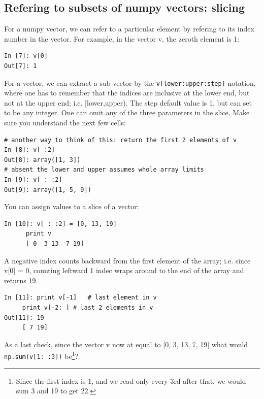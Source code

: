 \subsection{Refering to subsets of numpy vectors: slicing}\label{subsec:slicing}
For a numpy vector, we can refer to a particular element by refering to its 
index number in the vector. For example, in the vector v, the zeroth element 
is 1:
\begin{lstlisting}
In [7]: v[0]
Out[7]: 1	
\end{lstlisting}
For a vector, we can extract a sub-vector by the \lstinline{v[lower:upper:step]} notation, where 
one has to remember that the indices are inclusive at the lower end, but not at the upper end; 
i.e. [lower,upper). The step default value is 1, but can set to be any integer. 
One can omit any of the three parameters in the slice. Make sure you understand the next few cells:
\begin{lstlisting}
# another way to think of this: return the first 2 elements of v
In [8]: v[ :2] 
Out[8]: array([1, 3])
# absent the lower and upper assumes whole array limits
In [9]: v[ : :2] 
Out[9]: array([1, 5, 9])	
\end{lstlisting}
You can assign values to a slice of a vector:
\begin{lstlisting}
In [10]: v[ : :2] = [0, 13, 19]
	  print v
	  [ 0  3 13  7 19]	
\end{lstlisting}
A negative index counts backward from the first element of the array; i.e. since v[0] = 0, 
counting leftward 1 indec wraps around to the end of the array and returns 19.
\begin{lstlisting}
In [11]: print v[-1]   # last element in v
	 print v[-2: ] # last 2 elements in v
Out[11]: 19
	 [ 7 19]	
\end{lstlisting}
As a last check, since the vector v now at equal to [0, 3, 13, 7, 19] what would \lstinline{np.sum(v[1: :3])} be\footnote{Since the first index is 1, and we read only every 3rd after that, we would sum 3 and 19 to get 22.}?


